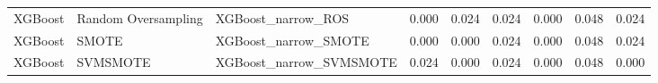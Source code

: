 \begin{tabular}{lllllllll}
                     XGBoost & Random Oversampling &                           XGBoost\_narrow\_ROS & 0.000 &                     0.024 &                 0.024 &                  0.000 &                                   0.048 &     0.024 \\
                     XGBoost &               SMOTE &                         XGBoost\_narrow\_SMOTE & 0.000 &                     0.000 &                 0.024 &                  0.000 &                                   0.048 &     0.024 \\
                     XGBoost &            SVMSMOTE &                      XGBoost\_narrow\_SVMSMOTE & 0.024 &                     0.000 &                 0.024 &                  0.000 &                                   0.048 &     0.000 \\
\bottomrule
\end{tabular}
